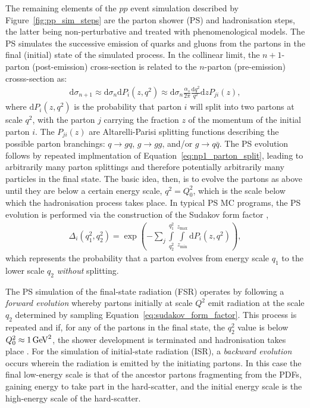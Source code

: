 The remaining elements of the $pp$ event simulation described by Figure~\ref{fig:pp_sim_steps} are the parton shower (PS)
and hadronisation steps, the latter being non-perturbative and treated with phenomenological models.
The PS simulates the successive emission of quarks and gluons from the partons in the final (initial) state of the
simulated process.
In the collinear limit, the $n+1$-parton (post-emission) cross-section is related to the $n$-parton (pre-emission) crosss-section
as:
\begin{align}
    \mathrm{d}\sigma_{n+1} \approx \mathrm{d}\sigma_n \mathrm{d}P_i(z, q^2) \approx \mathrm{d}\sigma_n \frac{\alpha_s}{2\pi} \frac{\mathrm{d}q^2}{q^2} \mathrm{d}z P_{ji}(z),
    \label{eq:np1_parton_split}
\end{align}
where $\mathrm{d}P_i(z,q^2)$ is the probability that parton $i$ will split into two partons at scale $q^2$, with the parton $j$ carrying the
fraction $z$ of the momentum of the initial parton $i$.
The $P_{ji}(z)$ are Altarelli-Parisi splitting functions describing the possible parton branchings: $q \rightarrow gq$, $g \rightarrow gg$, 
and/or $g \rightarrow q\bar{q}$.
The PS evolution follows by repeated implmentation of Equation~\ref{eq:np1_parton_split}, leading to arbitrarily many
parton splittings and therefore potentially arbitrarily many particles in the final state.
The basic idea, then, is to evolve the partons as above until they are below a certain energy scale, $q^2 = Q_0^2$, which is the scale
below which the hadronisation process takes place.
In typical PS MC programs, the PS evolution is performed via the construction of the Sudakov form factor {\color{red}{CHECK INDICES ETC}},
\begin{align}
    \Delta_i(q_1^2, q_2^2) = \exp \left ( - \sum\limits_j \int\limits_{q_2^2}^{q_1^2} \int\limits_{z_{\text{min}}}^{z_{\text{max}}} \mathrm{d}P_i(z,q^2) \right),
    \label{eq:sudakov_form_factor}
\end{align}
which represents the probability that a parton evolves from energy scale $q_1$ to the lower scale $q_2$ \textit{without} splitting.

The PS simulation of the final-state radiation (FSR) operates by following a \textit{forward evolution} whereby partons initially at scale $Q^2$
emit radiation at the scale $q_2$ determined by sampling Equation~\ref{eq:sudakov_form_factor}. This process is repeated and if,
for any of the partons in the final state, the $q_2^2$ value is below $Q_0^2 \approx 1\,\text{Ge\kern -0.1em V}^2$, the shower development is terminated
and hadronisation takes place {\color{red}{ISR IS THEREFORE SENSITIVE TO THE FACTORISATION SCALE AND PDF}}.
For the simulation of initial-state radiation (ISR), a \textit{backward evolution} occurs wherein the radiation is emitted
by the initiating partons. In this case the final low-energy scale is that of the ancestor partons fragmenting from the PDFs, gaining energy to take part
in the hard-scatter, and the initial energy scale is the high-energy scale of the hard-scatter.


